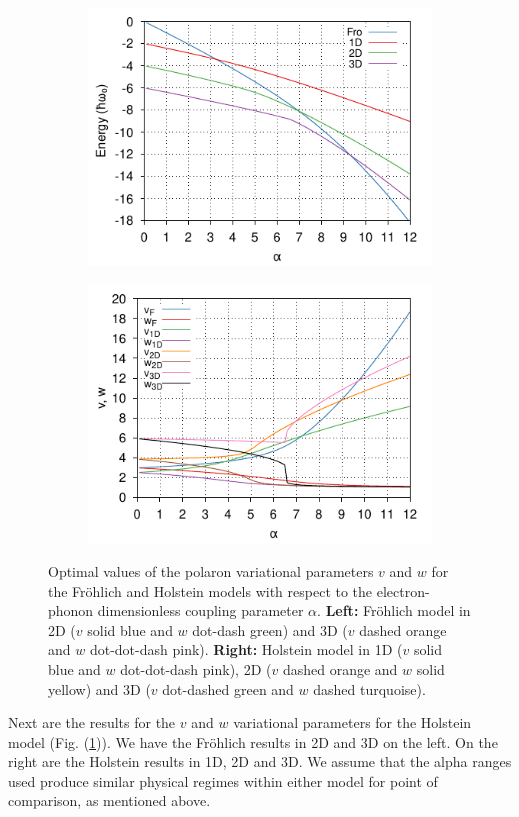 \begin{figure}
  \begin{subfigure}[b]{0.49\textwidth}
    \includegraphics[width=\textwidth]{figures/holstein-alpha-energy-COLOUR.pdf}
  \end{subfigure}
  \begin{subfigure}[b]{0.49\textwidth}
    \includegraphics[width=\textwidth]{figures/holstein-alpha-vw-COLOUR.pdf}
  \end{subfigure}
  \caption{Optimal values of the polaron variational parameters $v$ and $w$ for the Fr\"ohlich and Holstein models with respect to the electron-phonon dimensionless coupling parameter $\alpha$. \textbf{Left:} Fr\"ohlich model in 2D ($v$ solid blue and $w$ dot-dash green) and 3D ($v$ dashed orange and $w$ dot-dot-dash pink). \textbf{Right:} Holstein model in 1D ($v$ solid blue and $w$ dot-dot-dash pink), 2D ($v$ dashed orange and $w$ solid yellow) and 3D ($v$ dot-dashed green and $w$ dashed turquoise).}
  \label{fig:vw_alpha}
\end{figure}
Next are the results for the $v$ and $w$ variational parameters for the Holstein model (Fig. (\ref{fig:vw_alpha})). We have the Fr\"ohlich results in 2D and 3D on the left. On the right are the Holstein results in 1D, 2D and 3D. We assume that the alpha ranges used produce similar physical regimes within either model for point of comparison, as mentioned above.

